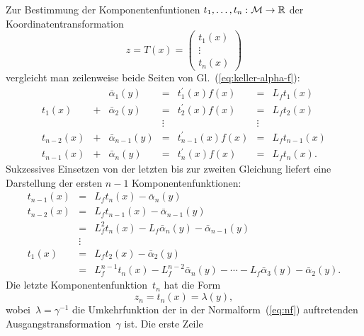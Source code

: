 Zur Bestimmung der Komponentenfuntionen $t_{1},\ldots,t_{n}:\mathcal{M}\to{\mathbb{R}}$
der Koordinatentransformation 
\begin{equation}
z=T(x)=\left(\begin{array}{c}
t_{1}(x)\\
\vdots\\
t_{n}(x)
\end{array}\right)\label{eq:keller-T-Ansatz}
\end{equation}
vergleicht man zeilenweise beide Seiten von Gl.~(\ref{eq:keller-alpha-f}):
\begin{equation}
\begin{array}{rclcrcl}
 &  & \bar{\alpha}_{1}(y) & = & t_{1}^{\prime}(x)f(x) & = & L_{f}t_{1}(x)\\
t_{1}(x) & + & \bar{\alpha}_{2}(y) & = & t_{2}^{\prime}(x)f(x) & = & L_{f}t_{2}(x)\\
 &  &  & \vdots &  & \vdots\\
t_{n-2}(x) & + & \bar{\alpha}_{n-1}(y) & = & t_{n-1}^{\prime}(x)f(x) & = & L_{f}t_{n-1}(x)\\
t_{n-1}(x) & + & \bar{\alpha}_{n}(y) & = & t_{n}^{\prime}(x)f(x) & = & L_{f}t_{n}(x).
\end{array}\label{eq:keller-vergleich-alpha-f}
\end{equation}
Sukzessives Einsetzen von der letzten bis zur zweiten Gleichung liefert
eine Darstellung der ersten $n-1$ Komponentenfunktionen: 
\begin{equation}
\begin{array}{rcl}
t_{n-1}(x) & = & L_{f}t_{n}(x)-\bar{\alpha}_{n}(y)\\
t_{n-2}(x) & = & L_{f}t_{n-1}(x)-\bar{\alpha}_{n-1}(y)\\
 & = & L_{f}^{2}t_{n}(x)-L_{f}\bar{\alpha}_{n}(y)-\bar{\alpha}_{n-1}(y)\\
 & \vdots\\
t_{1}(x) & = & L_{f}t_{2}(x)-\bar{\alpha}_{2}(y)\\
 & = & L_{f}^{n-1}t_{n}(x)-L_{f}^{n-2}\bar{\alpha}_{n}(y)-\cdots-L_{f}\bar{\alpha}_{3}(y)-\bar{\alpha}_{2}(y).
\end{array}\label{eq:Keller-trans1}
\end{equation}
Die letzte Komponentenfunktion~$t_{n}$ hat die Form 
\begin{equation}
z_{n}=t_{n}(x)=\lambda(y),\label{eq:Keller-transn}
\end{equation}
wobei~$\lambda=\gamma^{-1}$ die Umkehrfunktion der in der Normalform~(\ref{eq:nf})
auftretenden Ausgangstransformation~$\gamma$ ist. Die erste Zeile
